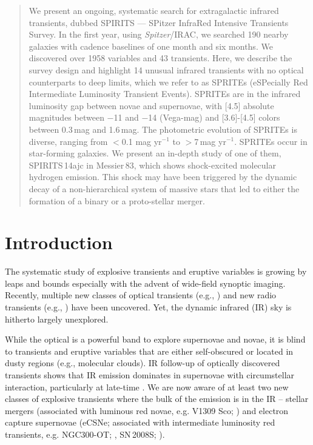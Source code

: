 \documentclass[twocolumn,times]{aastex6}
\begin{document}
\begin{abstract}
We present an ongoing, systematic search for extragalactic infrared transients, dubbed SPIRITS ---
SPitzer InfraRed Intensive Transients Survey. In the first year, using {\it Spitzer}/IRAC, we searched 190 nearby galaxies %
with cadence baselines of one month and six months. We discovered over 1958 variables and 43 transients. 
Here, we describe the survey design and highlight 14 unusual infrared transients with no optical counterparts to deep limits, which
we refer to as SPRITEs (eSPecially Red Intermediate Luminosity Transient Events).  SPRITEs are in the infrared luminosity gap between 
novae and supernovae, with [4.5] absolute magnitudes between $-$11 and $-$14 (Vega-mag) and [3.6]-[4.5] colors 
between 0.3\,mag and 1.6\,mag. The photometric evolution of SPRITEs is diverse, ranging from $<$0.1 mag yr$^{-1}$ to $>$7\,mag yr$^{-1}$. 
SPRITEs occur in star-forming galaxies. We present an in-depth study of one of them, SPIRITS\,14ajc  in Messier\,83, which shows shock-excited molecular hydrogen emission.
This shock may have been triggered by the dynamic decay of a non-hierarchical system of massive stars
that led to either the formation of a binary or a proto-stellar merger. 
\end{abstract}


\section{Introduction}
The systematic study of explosive transients and eruptive variables is growing by leaps and bounds
especially with the advent of wide-field synoptic imaging. 
Recently, multiple new classes of optical transients (e.g., \citealt{Kasliwal2012}) and new radio transients (e.g., \citealt{Thornton2013}) 
have been uncovered. Yet, the dynamic infrared (IR) sky is hitherto largely unexplored.

While the optical is a powerful band to explore supernovae and novae, it is blind to 
transients and eruptive variables that are either self-obscured or located in dusty regions
(e.g., molecular clouds). IR follow-up of optically discovered transients shows that
IR emission dominates in supernovae with circumstellar interaction, particularly at late-time \citep{Fox2011,Fox2013}. 
We are now aware of at least two new classes of explosive transients where the bulk of the 
emission is in the IR -- stellar mergers (associated with luminous red novae, e.g. V1309 Sco; \citealt{Tylenda2011}) and 
electron capture supernovae  (eCSNe; associated with intermediate luminosity red transients, e.g. NGC300-OT; \citealt{Bond2009}, 
SN\,2008S; \citealt{Prieto2008}).  
\end{document}
